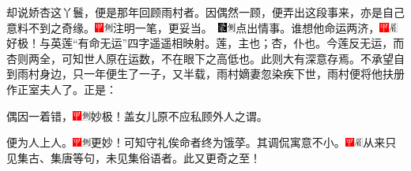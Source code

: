 {却说娇杏这丫鬟，便是那年回顾雨村者。因偶然一顾，便弄出这段事来，亦是自己意料不到之奇缘。{{\includegraphics[width=3mm]{../Images/00002}\includegraphics[width=3mm]{../Images/00011}\footnotesize \kaishu 注明一笔，更妥当。　}\includegraphics[width=3mm]{../Images/00006}\includegraphics[width=3mm]{../Images/00011}\footnotesize \kaishu 点出情事。}谁想他命运两济，{\includegraphics[width=3mm]{../Images/00002}\includegraphics[width=3mm]{../Images/00010}\footnotesize \kaishu 好极！与英莲``有命无运''四字遥遥相映射。莲，主也；杏，仆也。今莲反无运，而杏则两全，可知世人原在运数，不在眼下之高低也。此则大有深意存焉。}不承望自到雨村身边，只一年便生了一子，又半载，雨村嫡妻忽染疾下世，雨村便将他扶册作正室夫人了。正是：

偶因一着错，{\includegraphics[width=3mm]{../Images/00002}\includegraphics[width=3mm]{../Images/00011}\footnotesize \kaishu 妙极！盖女儿原不应私顾外人之谓。}

便为人上人。{\includegraphics[width=3mm]{../Images/00002}\includegraphics[width=3mm]{../Images/00011}\footnotesize \kaishu 更妙！可知守礼俟命者终为饿莩。其调侃寓意不小。\includegraphics[width=3mm]{../Images/00002}\includegraphics[width=3mm]{../Images/00010}\footnotesize \kaishu 从来只见集古、集唐等句，未见集俗语者。此又更奇之至！}

}
